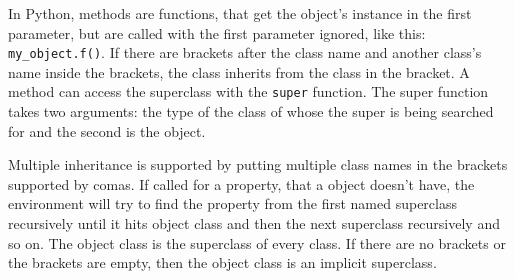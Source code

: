 In Python, methods are functions, that get the object's instance in the first
parameter, but are called with the first parameter ignored, like this:
\verb;my_object.f();. If there are brackets after the class name and another
class's name inside the brackets, the class inherits from the class in the
bracket. A method can access the superclass with the \verb;super; function. The
super function takes two arguments: the type of the class of whose the super is
being searched for and the second is the object.

Multiple inheritance is supported by putting multiple class names in the
brackets supported by comas. If called for a property, that a object doesn't
have, the environment will try to find the property from the first named
superclass recursively until it hits object class and then the next superclass
recursively and so on. The object class is the superclass of every class. If
there are no brackets or the brackets are empty, then the object class is an
implicit superclass.


